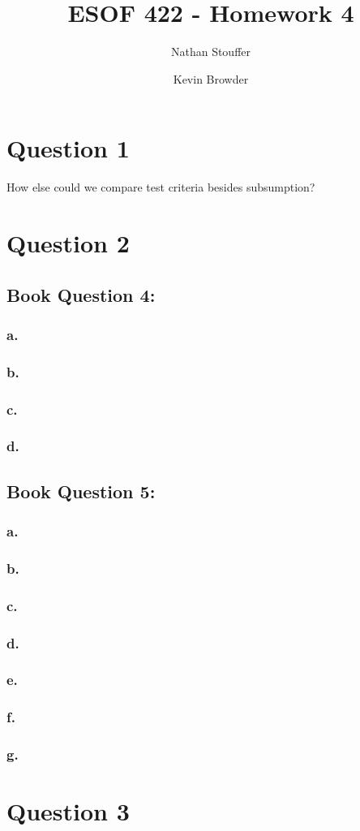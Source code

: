 \documentclass{article}
\begin{document}
\title{ESOF 422 - Homework 4}
\author{Nathan Stouffer \and Kevin Browder}

\maketitle
\newpage
\section*{Question 1}
How else could we compare test criteria besides subsumption?

\section*{Question 2}
\subsection*{Book Question 4:}
\subsubsection*{a.}
\subsubsection*{b.}
\subsubsection*{c.}
\subsubsection*{d.}

\subsection{Book Question 5:}

\subsubsection*{a.}
\subsubsection*{b.}
\subsubsection*{c.}
\subsubsection*{d.}
\subsubsection*{e.}
\subsubsection*{f.}
\subsubsection*{g.}
\section*{Question 3}
\end{document}
